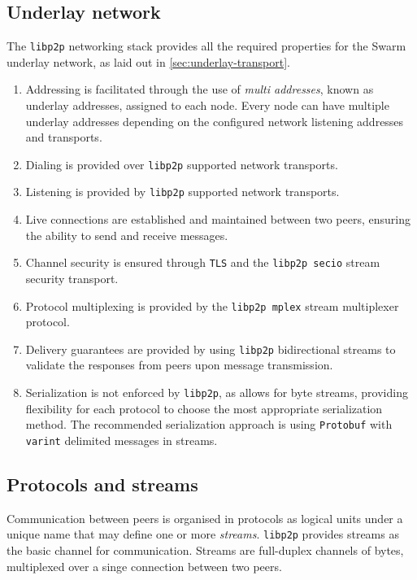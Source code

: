 
\subsection{Underlay network \statusgreen}

The \lstinline{libp2p} networking stack provides all the required properties for the Swarm underlay network, as laid out in \ref{sec:underlay-transport}.

\begin{enumerate}
\item Addressing is facilitated through the use of \emph{multi addresses}, known as underlay addresses, assigned to each node. Every node can have multiple underlay addresses depending on the configured network listening addresses and transports.
\item Dialing is provided over \lstinline{libp2p} supported network transports.
\item Listening is provided by \lstinline{libp2p} supported network transports.
\item Live connections are established and maintained between two peers, ensuring the ability to send and receive messages.
\item Channel security is ensured through \lstinline{TLS} and the \lstinline{libp2p secio} stream security transport.
\item Protocol multiplexing is provided by the \lstinline{libp2p mplex} stream multiplexer protocol.
\item Delivery guarantees are provided by using \lstinline{libp2p} bidirectional streams to validate the responses from peers upon message transmission.
\item Serialization is not enforced by \lstinline{libp2p}, as allows for byte streams, providing flexibility for each protocol to choose the most appropriate serialization method. The recommended serialization approach is using \lstinline{Protobuf} with \lstinline{varint} delimited messages in streams.
\end{enumerate}

\subsection{Protocols and streams \statusgreen}

Communication between peers is organised in protocols as logical units under a unique name that may define one or more \emph{streams}. \lstinline{libp2p} provides streams as the basic channel for communication. Streams are full-duplex channels of bytes, multiplexed over a singe connection between two peers.


